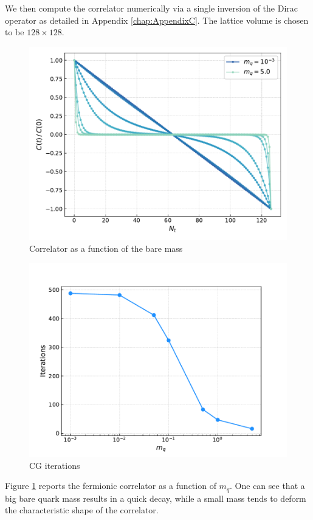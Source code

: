 We then compute the correlator numerically via a single inversion of the Dirac operator as detailed in Appendix \ref{chap:AppendixC}. The lattice volume is chosen to be $128 \times 128$. 
\begin{figure}
    \centering 
    \includegraphics[scale=0.6]{figures/correlator/correlator.pdf}
    \caption{Correlator as a function of the bare mass}
    \label{fig:correlator_mass}
\end{figure}
\begin{figure}
    \centering 
    \includegraphics[scale=0.6]{figures/correlator/CGiter.pdf}
    \caption{CG iterations}
    \label{fig:correlator_CGiter}
\end{figure}
Figure \ref{fig:correlator_mass} reports the fermionic correlator as a function of $m_q$. One can see that a big bare quark mass results in a quick decay, while a small mass tends to deform the characteristic shape of the correlator. \\
